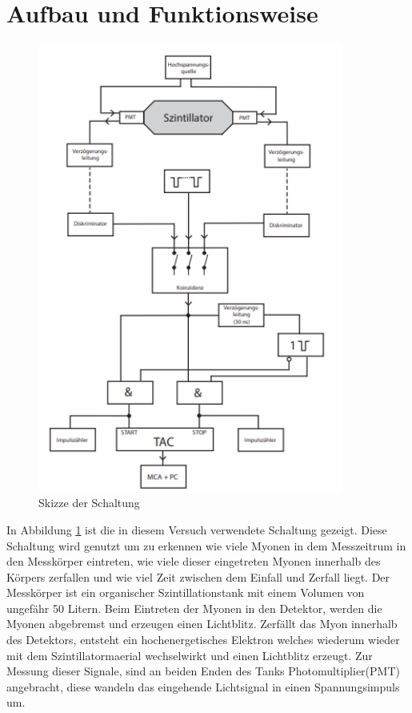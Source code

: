 \newpage
\section{Aufbau und Funktionsweise}
	
	\begin{figure}
		\includegraphics[width=10cm]{latex/images/Aufbau.png}
		\caption{Skizze der Schaltung \cite{V01}}
		\label{fig:Aufb}
	\end{figure}
    In Abbildung \ref{fig:Aufb} ist die in diesem Versuch verwendete Schaltung gezeigt.
    Diese Schaltung wird genutzt um zu erkennen wie viele Myonen in dem Messzeitrum in den Messkörper eintreten, wie viele dieser eingetreten Myonen innerhalb des Körpers zerfallen und wie viel Zeit zwischen dem Einfall und Zerfall liegt.
    Der Messkörper ist ein organischer Szintillationstank mit einem Volumen von ungefähr 50 Litern.
    Beim Eintreten der Myonen in den Detektor, werden die Myonen abgebremst und erzeugen einen Lichtblitz.
    Zerfällt das Myon innerhalb des Detektors, entsteht ein hochenergetisches Elektron welches wiederum wieder mit dem Szintillatormaerial wechselwirkt und einen Lichtblitz erzeugt.
    Zur Messung dieser Signale, sind an beiden Enden des Tanks Photomultiplier(PMT) angebracht, diese wandeln das eingehende Lichtsignal in einen Spannungsimpuls um. 
